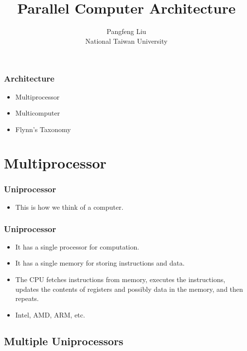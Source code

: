 \documentclass{beamer}
\begin{document}
\begin{CJK}{UTF8}{bsmi}

\title{Parallel Computer Architecture}

\author{Pangfeng Liu \\ National Taiwan University}

\begin{frame}
\titlepage
\end{frame}


\begin{frame}
\frametitle{Architecture}
\begin{itemize}
\item Multiprocessor
\item Multicomputer
\item Flynn's Taxonomy
\end{itemize}
\end{frame}

\section{Multiprocessor}

\begin{frame}
\frametitle{Uniprocessor}
\centerline{}
\begin{itemize}
\item This is how we think of a computer.
\end{itemize}
\end{frame}

\begin{frame}
\frametitle{Uniprocessor}
\begin{itemize}
\item It has a single processor for computation.
\item It has a single memory for storing instructions and data.
\item The CPU fetches instructions from memory, executes the instructions, updates the contents of registers and possibly data in the memory, and then repeats.
\item Intel, AMD, ARM, etc.
\end{itemize}
\end{frame}


\subsection{Multiple Uniprocessors}


\end{CJK}
\end{document}
